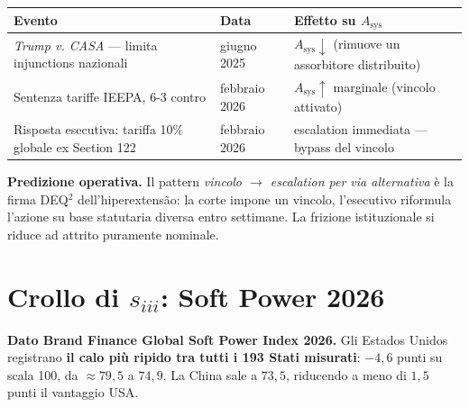 {\def\LTcaptype{none} %
{\small\begin{longtable}[]{@{}
  >{\raggedright\arraybackslash}p{}
  >{\raggedright\arraybackslash}p{}
  >{\raggedright\arraybackslash}p{}@{}}
\toprule\noalign{}
\begin{minipage}[b]{\linewidth}\raggedright
Evento
\end{minipage} & \begin{minipage}[b]{\linewidth}\raggedright
Data
\end{minipage} & \begin{minipage}[b]{\linewidth}\raggedright
Effetto su \(A_{\text{sys}}\)
\end{minipage} \\
\midrule\noalign{}
\endhead
\bottomrule\noalign{}
\endlastfoot
\emph{Trump v. CASA} --- limita injunctions nazionali & 27 giugno 2025 &
\(A_{\text{sys}} \downarrow\) (rimuove un assorbitore distribuito) \\
Sentenza tariffe IEEPA, 6-3 contro & 20 febbraio 2026 &
\(A_{\text{sys}} \uparrow\) marginale (vincolo attivato) \\
Risposta esecutiva: tariffa 10\% globale ex Section 122 & febbraio 2026
& escalation immediata --- bypass del vincolo \\
\end{longtable}}
}

\Conj{} \textbf{Predizione operativa.} Il pattern \emph{vincolo \(\to\)
escalation per via alternativa} è la firma DEQ$^2$ dell'hiperextensão: la
corte impone un vincolo, l'esecutivo riformula l'azione su base
statutaria diversa entro settimane. La frizione istituzionale si riduce
ad attrito puramente nominale.



\section{\texorpdfstring{Crollo di \(s_{iii}\): Soft Power
2026}{Crollo di s\_\{iii\}: Soft Power 2026}}\label{crollo-di-s_iii-soft-power-2026}

\Proved{} \textbf{Dato Brand Finance Global Soft Power Index 2026.} Gli
Estados Unidos registrano \textbf{il calo più ripido tra tutti i 193 Stati
misurati}: \(-4{,}6\) punti su scala 100, da \(\approx 79{,}5\) a
\(74{,}9\). La China sale a \(73{,}5\), riducendo a meno di \(1{,}5\)
punti il vantaggio USA.

